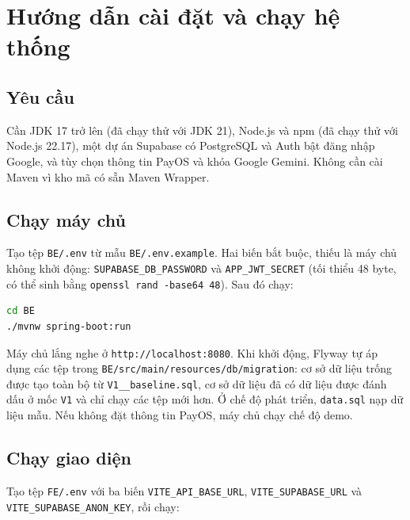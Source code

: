 \chapter{Hướng dẫn cài đặt và chạy hệ thống}
\label{pl:caidat}


\section{Yêu cầu}
Cần JDK 17 trở lên (đã chạy thử với JDK 21), Node.js và npm (đã chạy thử với Node.js 22.17), một dự án Supabase có PostgreSQL và Auth bật đăng nhập Google, và tùy chọn thông tin PayOS và khóa Google Gemini. Không cần cài Maven vì kho mã có sẵn Maven Wrapper.

\section{Chạy máy chủ}
Tạo tệp \texttt{BE/.env} từ mẫu \texttt{BE/.env.example}. Hai biến bắt buộc, thiếu là máy chủ không khởi động: \texttt{SUPABASE\_DB\_PASSWORD} và \texttt{APP\_JWT\_SECRET} (tối thiểu 48 byte, có thể sinh bằng \texttt{openssl rand -base64 48}). Sau đó chạy:

\begin{lstlisting}[language=bash]
cd BE
./mvnw spring-boot:run
\end{lstlisting}

Máy chủ lắng nghe ở \texttt{http://localhost:8080}. Khi khởi động, Flyway tự áp dụng các tệp trong \nolinkurl{BE/src/main/resources/db/migration}: cơ sở dữ liệu trống được tạo toàn bộ từ \texttt{V1\_\_baseline.sql}, cơ sở dữ liệu đã có dữ liệu được đánh dấu ở mốc \texttt{V1} và chỉ chạy các tệp mới hơn. Ở chế độ phát triển, \texttt{data.sql} nạp dữ liệu mẫu. Nếu không đặt thông tin PayOS, máy chủ chạy chế độ demo.

\section{Chạy giao diện}
Tạo tệp \texttt{FE/.env} với ba biến \texttt{VITE\_API\_BASE\_URL}, \texttt{VITE\_SUPABASE\_URL} và \texttt{VITE\_SUPABASE\_ANON\_KEY}, rồi chạy:

